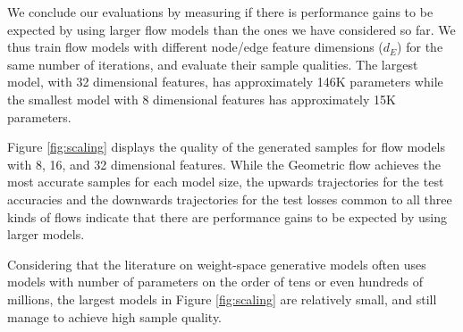 We conclude our evaluations by measuring if there is performance gains to be expected by using larger flow models than the ones we have considered so far. We thus train flow models with different node/edge feature dimensions ($d_E$) for the same number of iterations, and evaluate their sample qualities. The largest model, with 32 dimensional features, has approximately 146K parameters while the smallest model with 8 dimensional features has approximately 15K parameters. 

Figure \ref{fig:scaling} displays the quality of the generated samples for flow models with 8, 16, and 32 dimensional features. While the Geometric flow achieves the most accurate samples for each model size, the upwards trajectories for the test accuracies and the downwards trajectories for the test losses common to all three kinds of flows indicate that there are performance gains to be expected by using larger models. 

Considering that the literature on weight-space generative models often uses models with number of parameters on the order of tens or even hundreds of millions, the largest models in Figure \ref{fig:scaling} are relatively small, and still manage to achieve high sample quality. 

